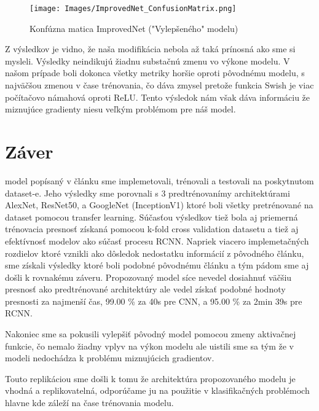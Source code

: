 \documentclass[journal,onecolumn]{IEEEtran}
\begin{document}
\begin{figure}[!htb]
    \centering
    \texttt{[image: Images/ImprovedNet\_ConfusionMatrix.png]}
    \caption{Konfúzna matica ImprovedNet ("Vylepšeného" modelu)}
    \label{fig:enter-label}
\end{figure}

Z výsledkov je vidno, že naša modifikácia nebola až taká prínosná ako sme si mysleli. Výsledky neindikujú žiadnu substačnú zmenu vo výkone modelu. V našom prípade boli dokonca všetky metriky horšie oproti pôvodnému modelu, s najväčšou zmenou v čase trénovania, čo dáva zmysel pretože funkcia Swish je viac počítačovo námahová oproti ReLU. Tento výsledok nám však dáva informáciu že miznujúce gradienty niesu veľkým problémom pre náš model.

\section{Záver}
 model popísaný v článku sme implemetovali, trénovali a testovali na poskytnutom dataset-e. Jeho výsledky sme porovnali s 3 predtrénovanímy architektúrami AlexNet, ResNet50, a GoogleNet (InceptionV1) ktoré boli všetky pretrénované na dataset pomocou transfer learning. Súčasťou výsledkov tiež bola aj priemerná trénovacia presnosť získaná pomocou k-fold cross validation datasetu a tiež aj efektívnosť modelov ako súčasť procesu RCNN. Napriek viacero implemetačných rozdielov ktoré vznikli ako dôsledok nedostatku informácií z pôvodného článku, sme získali výsledky ktoré boli podobné pôvodnému článku a tým pádom sme aj došli k rovnakému záveru. Propozovaný model síce nevedel dosiahnuť väčšiu presnosť ako predtrénované architektúry ale vedel získať podobné hodnoty presnosti za najmenší čas, 99.00 \% za 40s pre CNN, a 95.00 \%  za 2min 39s pre RCNN.

\vspace{10pt}

\IEEEPARstart{}{} Nakoniec sme sa pokusili vylepšiť pôvodný model pomocou zmeny aktivačnej funkcie, čo nemalo žiadny vplyv na výkon modelu ale uistili sme sa tým že v modeli nedochádza k problému miznujúcich gradientov.

\vspace{10pt}

\IEEEPARstart{}{} Touto replikáciou sme došli k tomu že architektúra propozovaného modelu je vhodná a replikovatelná, odporúčame ju na použitie v klasifikačných problémoch hlavne kde záleží na čase trénovania modelu. 
\end{document}
